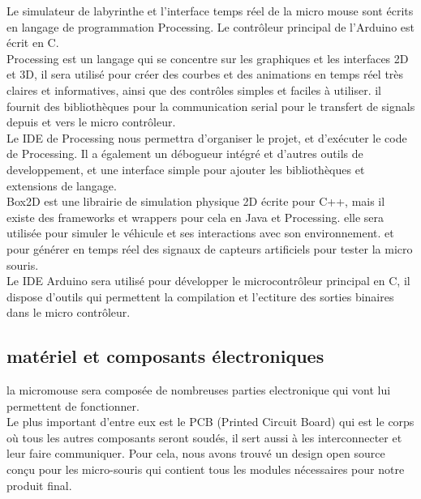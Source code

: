    Le simulateur de labyrinthe et l'interface temps réel de la micro mouse sont écrits en
langage de programmation Processing. Le contrôleur principal de l'Arduino est
écrit en C. \\

   Processing est un langage qui se concentre sur les graphiques et les interfaces 2D et 3D,
il sera utilisé pour créer des courbes et des animations en temps réel très claires et 
informatives, ainsi que des contrôles simples et faciles à utiliser. il fournit des 
bibliothèques pour la communication serial pour le transfert de signals depuis et vers le
micro contrôleur. \\


   Le IDE de Processing nous permettra d'organiser le projet, et d'exécuter le code de Processing.
Il a également un débogueur intégré et d'autres outils de developpement, et une interface simple pour
ajouter les bibliothèques et extensions de langage. \\


   Box2D est une librairie de simulation physique 2D écrite pour C++, mais il existe des frameworks
et wrappers pour cela en Java et Processing. elle sera utilisée pour simuler le véhicule et ses
interactions avec son environnement. et pour générer en temps réel des signaux de capteurs
artificiels pour tester la micro souris. \\


   Le IDE Arduino sera utilisé pour développer le microcontrôleur principal en
C, il dispose d'outils qui permettent la compilation et l'ectiture des sorties
binaires dans le micro contrôleur. \\

\subsection{matériel et composants électroniques} \label{subsec:hardDev}

	la micromouse sera composée de nombreuses parties electronique qui vont lui
permettent de fonctionner. \\


	Le plus important d'entre eux est le PCB (Printed Circuit Board) qui est le
corps où tous les autres composants seront soudés, il sert aussi à les
interconnecter et  leur faire communiquer. Pour cela, nous avons trouvé un
design open source \cite{Bulebule:1} conçu pour les micro-souris qui
contient tous les modules nécessaires pour notre produit final. \\


